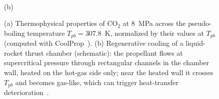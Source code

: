\documentclass[11pt]{article}
\begin{document}
\begin{figure}[t]
\begin{minipage}[c]{0.58\textwidth}
{}\\[-2pt]
{\small (b)}
\end{minipage}
\caption{(a) Thermophysical properties of CO$_2$ at 8~MPa across the pseudo-boiling
temperature $T_{pb}=307.8$~K, normalized by their values at $T_{pb}$ (computed with
CoolProp~\cite{CoolProp2014}). (b) Regenerative cooling of a liquid-rocket thrust chamber
(schematic): the propellant flows at supercritical pressure through rectangular channels in the
chamber wall, heated on the hot-gas side only; near the heated wall it crosses $T_{pb}$ and becomes
gas-like, which can trigger heat-transfer deterioration~\cite{Pizzarelli2018,Nasuti2021,Urbano2013}.}
\label{fig:background}
\end{figure}
\end{document}
